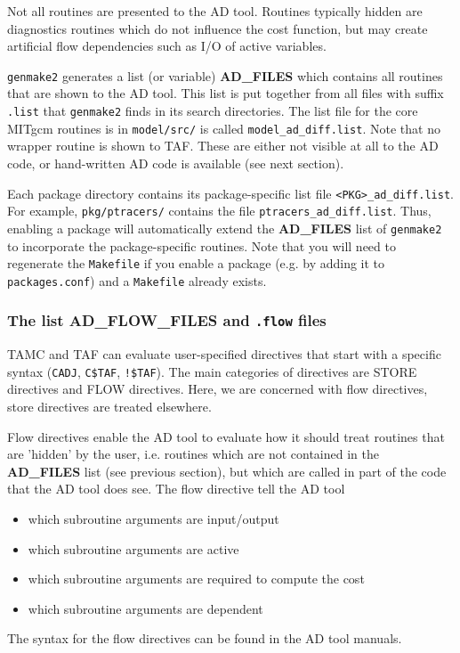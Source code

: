 Not all routines are presented to the AD tool.
Routines typically hidden are diagnostics routines which
do not influence the cost function, but may create 
artificial flow dependencies such as I/O of active variables.

{\tt genmake2} generates a list (or variable) {\bf AD\_FILES}
which contains all routines that are shown to the AD tool.
This list is put together from all files with suffix {\tt .list}
that {\tt genmake2} finds in its search directories.
The list file for the core MITgcm routines is in {\tt model/src/}
is called {\tt model\_ad\_diff.list}.
Note that no wrapper routine is shown to TAF. These are either
not visible at all to the AD code, or hand-written AD code
is available (see next section).

Each package directory contains its package-specific
list file {\tt <PKG>\_ad\_diff.list}. For example,
{\tt pkg/ptracers/} contains the file {\tt ptracers\_ad\_diff.list}.
Thus, enabling a package will automatically extend the
{\bf AD\_FILES} list of {\tt genmake2} to incorporate the
package-specific routines.
Note that you will need to regenerate the {\tt Makefile} if
you enable a package (e.g. by adding it to {\tt packages.conf})
and a {\tt Makefile} already exists.

\subsubsection{The list AD\_FLOW\_FILES and {\tt .flow} files}

TAMC and TAF can evaluate user-specified directives
that start with a specific syntax ({\tt CADJ}, {\tt C\$TAF}, {\tt !\$TAF}).
The main categories of directives are STORE directives and
FLOW directives. Here, we are concerned with flow directives,
store directives are treated elsewhere.

Flow directives enable the AD tool to evaluate how it should treat
routines that are 'hidden' by the user, i.e. routines which are
not contained in the {\bf AD\_FILES} list (see previous section), 
but which are called in part of the code that the AD tool does see.
The flow directive tell the AD tool
%
\begin{itemize}
%
\item which subroutine arguments are input/output
\item which subroutine arguments are active
\item which subroutine arguments are required to compute the cost
\item which subroutine arguments are dependent
%
\end{itemize}
%
The syntax for the flow directives can be found in the
AD tool manuals.


